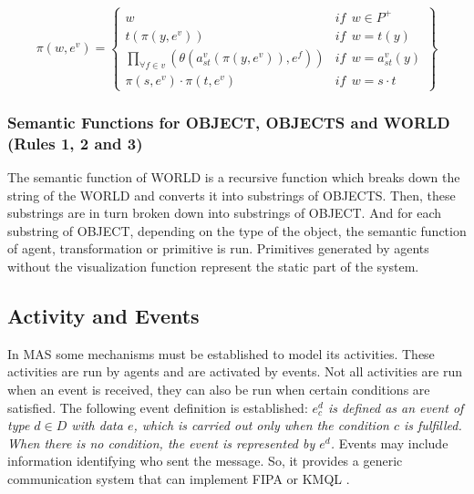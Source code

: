 \documentclass[runningheads]{llncs}
\begin{document}
\begin{small}
\begin{equation}
    \pi (w, e^v) = \left\{
    \begin{array}{ll}
        w   & \mathit{if}  \ \ w \in P^+  \\

        t(\pi (y, e^v))     & \mathit{if}  \ \  w = t(y)  \\

        \underset{\forall f \in v}{ \prod }(\theta (a_{st}^v (\pi
            (y, e^v)), e^f))    & \mathit{if}  \ \ w = a_{st}^v(y) \\

        \pi (s, e^v) \cdot \pi (t, e^v)    & \mathit{if}  \
            \  w = s \cdot t
    \end{array}\right\}
\end{equation}
\end{small}


\subsubsection{Semantic Functions for OBJECT, OBJECTS and WORLD (Rules 1,
2 and 3)
\label{sec:rules123}}

The semantic function of WORLD is a recursive function
which breaks down the string of the WORLD and converts it into substrings of OBJECTS. Then, these
substrings are in turn broken down into substrings of OBJECT. And for each substring of OBJECT,
depending on the type of the object, the semantic function of agent, transformation or primitive is
run. Primitives generated by agents without the visualization function represent the static
part of the system.

\subsection{Activity and Events
\label{sec:activity_events}}

In MAS some mechanisms must be established to model its activities.
These activities are run by agents and are activated by events.
Not all activities are run when an event is received, they can also be run when certain
conditions are satisfied.
The following event definition is established: {\itshape
$e_c^d$ is defined as an event of type $d \in D$ with data $e$, which is carried out only when the
condition $c$ is fulfilled. When there is no condition, the event is
represented by $e^d$.} Events may include information identifying who sent the message. So, it provides a generic
communication system that can implement FIPA or KMQL \cite{Genesereth1995}.
\end{document}

